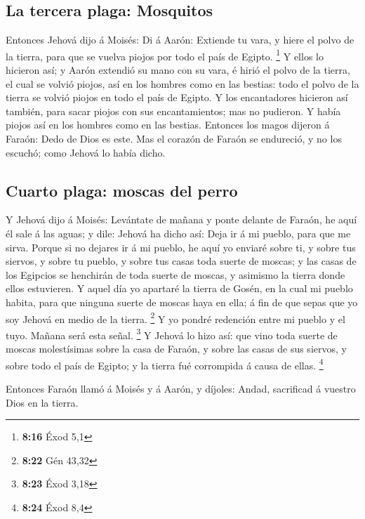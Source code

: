 \hypertarget{la-tercera-plaga-mosquitos}{%
\subsection{La tercera plaga:
Mosquitos}\label{la-tercera-plaga-mosquitos}}

 Entonces Jehová dijo á Moisés: Di á Aarón: Extiende tu
vara, y hiere el polvo de la tierra, para que se vuelva piojos por todo
el país de Egipto. \footnote{\textbf{8:16} Éxod 5,1}  Y
ellos lo hicieron así; y Aarón extendió su mano con su vara, é hirió el
polvo de la tierra, el cual se volvió piojos, así en los hombres como en
las bestias: todo el polvo de la tierra se volvió piojos en todo el país
de Egipto.  Y los encantadores hicieron así también, para
sacar piojos con sus encantamientos; mas no pudieron. Y había piojos así
en los hombres como en las bestias.  Entonces los magos
dijeron á Faraón: Dedo de Dios es este. Mas el corazón de Faraón se
endureció, y no los escuchó; como Jehová lo había dicho.

\hypertarget{cuarto-plaga-moscas-del-perro}{%
\subsection{Cuarto plaga: moscas del
perro}\label{cuarto-plaga-moscas-del-perro}}

 Y Jehová dijo á Moisés: Levántate de mañana y ponte
delante de Faraón, he aquí él sale á las aguas; y dile: Jehová ha dicho
así: Deja ir á mi pueblo, para que me sirva.  Porque si
no dejares ir á mi pueblo, he aquí yo enviaré sobre ti, y sobre tus
siervos, y sobre tu pueblo, y sobre tus casas toda suerte de moscas; y
las casas de los Egipcios se henchirán de toda suerte de moscas, y
asimismo la tierra donde ellos estuvieren.  Y aquel día
yo apartaré la tierra de Gosén, en la cual mi pueblo habita, para que
ninguna suerte de moscas haya en ella; á fin de que sepas que yo soy
Jehová en medio de la tierra. \footnote{\textbf{8:22} Gén 43,32}
 Y yo pondré redención entre mi pueblo y el tuyo. Mañana
será esta señal. \footnote{\textbf{8:23} Éxod 3,18}  Y
Jehová lo hizo así: que vino toda suerte de moscas molestísimas sobre la
casa de Faraón, y sobre las casas de sus siervos, y sobre todo el país
de Egipto; y la tierra fué corrompida á causa de ellas. \footnote{\textbf{8:24}
  Éxod 8,4}

 Entonces Faraón llamó á Moisés y á Aarón, y díjoles:
Andad, sacrificad á vuestro Dios en la tierra.


